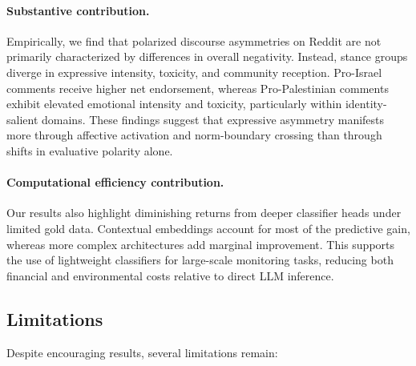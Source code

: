 \documentclass[letterpaper]{article} %
\begin{document}
\paragraph{Substantive contribution.}
Empirically, we find that polarized discourse asymmetries on Reddit are not primarily characterized by differences in overall negativity. Instead, stance groups diverge in expressive intensity, toxicity, and community reception. Pro-Israel comments receive higher net endorsement, whereas Pro-Palestinian comments exhibit elevated emotional intensity and toxicity, particularly within identity-salient domains. These findings suggest that expressive asymmetry manifests more through affective activation and norm-boundary crossing than through shifts in evaluative polarity alone.

\paragraph{Computational efficiency contribution.}
Our results also highlight diminishing returns from deeper classifier heads under limited gold data. Contextual embeddings account for most of the predictive gain, whereas more complex architectures add marginal improvement. This supports the use of lightweight classifiers for large-scale monitoring tasks, reducing both financial and environmental costs relative to direct LLM inference.

\subsection{Limitations}\label{sec:limitations}

Despite encouraging results, several limitations remain:
\end{document}
